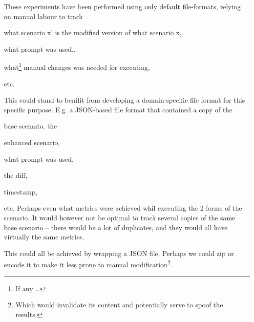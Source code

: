 These experiments have been performed using only default file-formats, relying on manual labour to
track \begin{inparaenum}
    \item what scenario x' is the modified version of what scenario x,
    \item what prompt was used,.
    \item what\footnote{If any \ldots} manual changes was needed for executing,
\end{inparaenum} etc.

This could stand to benifit from developing a domain-specific file format for this specific purpose.
E.g. a JSON-based file format that contained a copy of the \begin{inparaenum}
    \item base scenario, the
    \item enhanced scenario,
    \item what prompt was used,
    \item the diff,
    \item timestamp,
\end{inparaenum} etc. Perhaps even what metrics were achieved whil executing the 2 forms of the
scenario. It would however not be optimal to track several copies of the same base scenario -- there
would be a lot of duplicates, and they would all have virtually the same metrics.

This could all be achieved by wrapping a JSON file. Perhaps we could zip or encode it to make it
less prone to manual modification\footnote{Which would invalidate its content and potentially serve
    to spoof the results.}.
